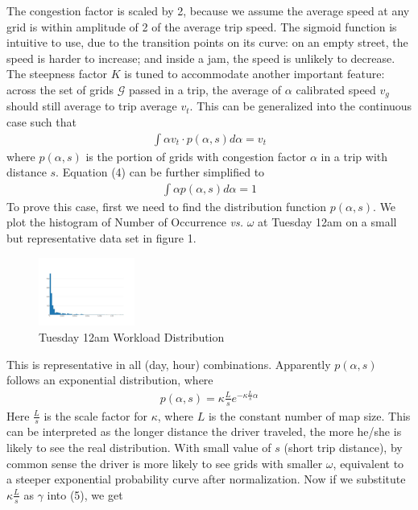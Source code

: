 \documentclass[letterpaper, 10 pt, conference]{ieeeconf}
\begin{document}
\begin{enumerate}
The congestion factor is scaled by 2, because we assume the average speed at any grid is within amplitude of 2 of the average trip speed. The sigmoid function is intuitive to use, due to the transition points on its curve: on an empty street, the speed is harder to increase; and inside a jam, the speed is unlikely to decrease. The steepness factor $K$ is tuned to accommodate another important feature: across the set of grids $\mathcal{G}$ passed in a trip, the average of $\alpha$ calibrated speed $v_g$ should still average to trip average $v_t$. This can be generalized into the continuous case such that
\begin{align}
\int \alpha v_t\cdot p(\alpha, s)d\alpha = v_t
\end{align}
where $p(\alpha, s)$ is the portion of grids with congestion factor $\alpha$ in a trip with distance $s$. Equation (4) can be further simplified to
\begin{align}
\int \alpha p(\alpha, s)d\alpha = 1
\end{align}
To prove this case, first we need to find the distribution function $p(\alpha,s)$. We plot the histogram of Number of Occurrence \textit{vs.} $\omega$ at Tuesday 12am on a small but representative data set in figure 1. 
\begin{figure}
\centering
\includegraphics[width=0.28\textwidth]{0am-busy.jpeg}
\caption{Tuesday 12am Workload Distribution}
\end{figure}
This is representative in all (day, hour) combinations. Apparently $p(\alpha, s)$ follows an exponential distribution, where
\begin{align}
p(\alpha, s) = \kappa\frac{L}{s}e^{-\kappa\frac{L}{s}\alpha}
\end{align}
Here $\frac{L}{s}$ is the scale factor for $\kappa$, where $L$ is the constant number of map size. This can be interpreted as the longer distance the driver traveled, the more he/she is likely to see the real distribution. With small value of $s$ (short trip distance), by common sense the driver is more likely to see grids with smaller $\omega$, equivalent to a steeper exponential probability curve after normalization. Now if we substitute $\kappa\frac{L}{s}$ as $\gamma$ into (5), we get 
\begin{align}

\end{align}
\end{enumerate}
\end{document}
